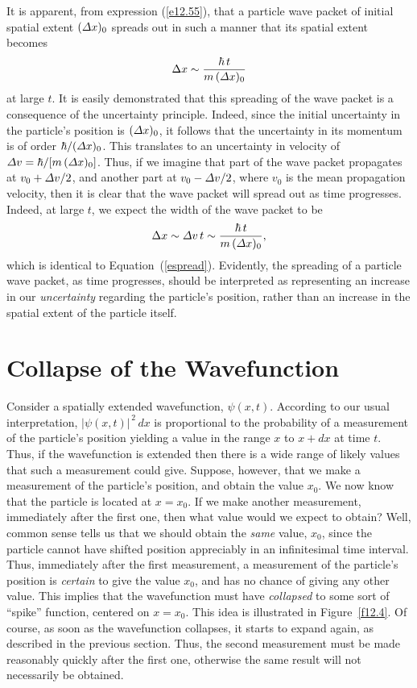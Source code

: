 It is apparent, from expression (\ref{e12.55}),
that a particle wave packet of initial spatial extent $({\mit\Delta} x)_0$
  spreads out in such a manner  that its spatial extent becomes
\begin{equation}\label{espread}
\Delta x\sim \frac{\hbar\,t}{m\,({\mit\Delta}x)_0}
\end{equation}
at large $t$.
It is easily demonstrated that this spreading of the wave packet is a consequence of the
uncertainty principle. Indeed, since the initial uncertainty in the particle's
position is $({\mit\Delta}x)_0$, it follows that the uncertainty in its
momentum is of order $\hbar/({\mit\Delta}x)_0$. This translates to an uncertainty
in velocity of ${\mit\Delta}v = \hbar/[m\,({\mit\Delta}x)_0]$. Thus,
if we imagine that part of the wave packet propagates at $v_0+ {\mit\Delta}v/2$, and another part at $v_0-{\mit\Delta}v/2$, where $v_0$ is
the mean propagation velocity, then it is clear that the wave packet will
 spread out as time progresses. Indeed, at large $t$, we expect the
width of the wave packet to be
\begin{equation}
\Delta x \sim {\mit\Delta}v\,t \sim  \frac{\hbar\,t}{m\,({\mit\Delta}x)_0},
\end{equation}
which is identical to Equation~(\ref{espread}). Evidently, the spreading of
a particle wave packet, as time progresses, should be interpreted as representing an increase
in our {\em uncertainty}\/ regarding the particle's position, rather than
an increase in the spatial extent of the particle itself.

\section{Collapse of the Wavefunction}\label{scoll}
Consider a spatially extended wavefunction, $\psi(x,t)$. According to our
usual interpretation, $|\psi(x,t)|^{\,2}\,dx$ is proportional to the
probability  of a measurement of the particle's position yielding 
a value in the range  $x$ to $x+dx$ at time $t$. Thus, if the wavefunction is extended then there is a wide
range of likely values that such a  measurement could give. 
Suppose, however, that we make  a measurement of the particle's position, and obtain the value $x_0$.
We now know that the particle is located at $x=x_0$.  
If we make another measurement, immediately after the first one, then
what value would we expect to obtain? Well, common sense tells us that
we should obtain the {\em same}\/ value, $x_0$, since the particle
cannot have shifted position appreciably in an infinitesimal  time interval. 
Thus, immediately after the first measurement, a measurement of
the particle's position is {\em certain}\/ to give the value $x_0$, and has
no chance of giving any other value. This implies that the
wavefunction must have {\em collapsed}\/ to some sort of  ``spike'' function,
centered on $x=x_0$. This idea is illustrated in Figure~\ref{f12.4}.
Of course, as soon as the wavefunction collapses, it  starts to
expand again, as described in the previous section. Thus, the second measurement
must be made reasonably quickly after the first one, otherwise the
same result will not necessarily be obtained.

